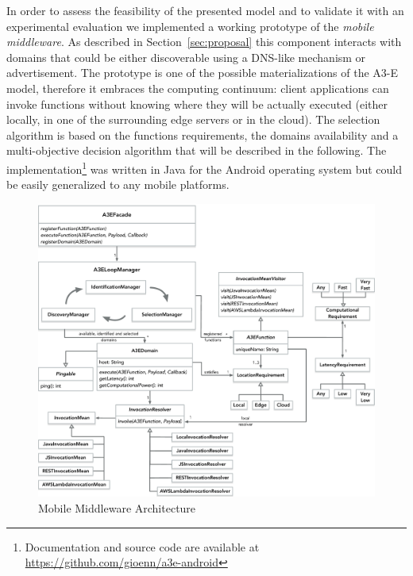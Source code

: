 
In order to assess the feasibility of the presented model and to validate it with an experimental evaluation we implemented a working prototype of the \textit{mobile middleware}. As described in Section~\ref{sec:proposal} this component interacts with  domains that could be either discoverable using a DNS-like mechanism or advertisement. The prototype is one of the possible materializations of the A3-E model, therefore it embraces the computing continuum: client applications can invoke functions without knowing where they will be actually executed (either locally, in one of the surrounding edge servers or in the cloud). The selection algorithm is based on the functions requirements, the domains availability and a multi-objective decision algorithm that will be described in the following. The implementation\footnote{Documentation and source code are available at \url{https://github.com/gioenn/a3e-android}} was written in Java for the Android operating system but could be easily generalized to any mobile platforms. 
\begin{figure}[tbp]
	\includegraphics[width=1\textwidth]{figs/a3e-mobile-prototype}
	\caption{Mobile Middleware Architecture}
	\label{fig:mobile-prototype}
\end{figure}

